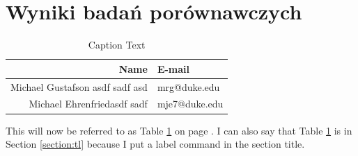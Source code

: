 \documentclass[11pt]{article}
\begin{document}
\section{Wyniki badań porównawczych }
\begin{figure}[ht]
\end{figure}
\begin{table}[h] %
\begin{center}
\begin{tabular}{|r|l|}\hline
Name & E-mail\\ \hline\hline
Michael Gustafson asdf sadf asd & mrg@duke.edu\\ \hline
Michael Ehrenfriedasdf sadf & mje7@duke.edu\\ \hline
\end{tabular}
\caption{\label{table:one}Caption Text} %
\end{center}
\end{table}
This will now be referred to as Table \ref{table:one} on %
page \pageref{table:one}. %
I can also say that Table \ref{table:one} is in Section
\ref{section:tl} because I put a label command in the %
section title.
\end{document}
